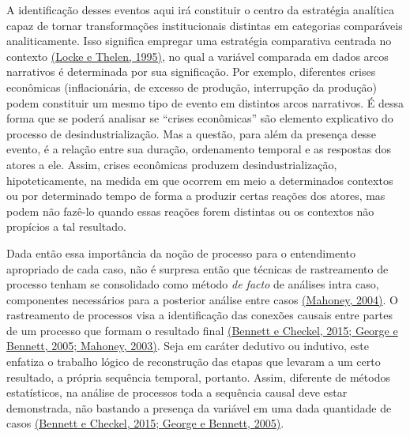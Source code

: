 A identificação desses eventos aqui irá constituir o centro da
estratégia analítica capaz de tornar transformações institucionais
distintas em categorias comparáveis analiticamente. Isso significa
empregar uma estratégia comparativa centrada no contexto
\href{https://www.zotero.org/google-docs/?Ca4unC}{(Locke e Thelen,
1995)}, no qual a variável comparada em dados arcos narrativos é
determinada por sua significação. Por exemplo, diferentes crises
econômicas (inflacionária, de excesso de produção, interrupção da
produção) podem constituir um mesmo tipo de evento em distintos arcos
narrativos. É dessa forma que se poderá analisar se ``crises
econômicas'' são elemento explicativo do processo de
desindustrialização. Mas a questão, para além da presença desse evento,
é a relação entre sua duração, ordenamento temporal e as respostas dos
atores a ele. Assim, crises econômicas produzem desindustrialização,
hipoteticamente, na medida em que ocorrem em meio a determinados
contextos ou por determinado tempo de forma a produzir certas reações
dos atores, mas podem não fazê-lo quando essas reações forem distintas
ou os contextos não propícios a tal resultado.

Dada então essa importância da noção de processo para o entendimento
apropriado de cada caso, não é surpresa então que técnicas de
rastreamento de processo tenham se consolidado como método \emph{de
facto} de análises intra caso, componentes necessários para a posterior
análise entre casos
\href{https://www.zotero.org/google-docs/?cZ1TJ0}{(Mahoney, 2004)}. O
rastreamento de processos visa a identificação das conexões causais
entre partes de um processo que formam o resultado final
\href{https://www.zotero.org/google-docs/?QfN5PS}{(Bennett e Checkel,
2015; George e Bennett, 2005; Mahoney, 2003)}. Seja em caráter dedutivo
ou indutivo, este enfatiza o trabalho lógico de reconstrução das etapas
que levaram a um certo resultado, a própria sequência temporal,
portanto. Assim, diferente de métodos estatísticos, na análise de
processos toda a sequência causal deve estar demonstrada, não bastando a
presença da variável em uma dada quantidade de casos
\href{https://www.zotero.org/google-docs/?Z9OdAp}{(Bennett e Checkel,
2015; George e Bennett, 2005)}.


